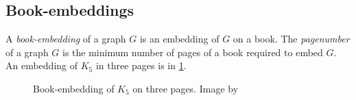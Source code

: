 \subsection{Book-embeddings}
A \textit{book-embedding} of a graph \(G\) is an embedding of \(G\) on a book. The \textit{pagenumber} of a graph \(G\) is the minimum number of pages of a book required to embed \(G\).
An embedding of $K_5$ in three pages is in \cref{fig:book-embedding}.

\begin{figure}[h!]
	\centering
	
	\caption[Three-page book-embedding of $K_5$]{Book-embedding of $K_5$ on three pages. Image by \textcite{eppsteinBookEmbedding2014}}\label{fig:book-embedding}
\end{figure}